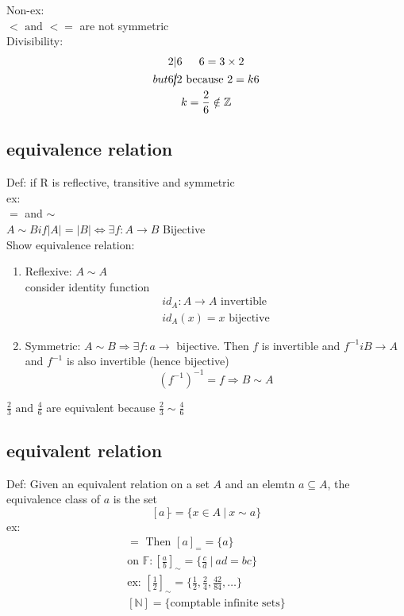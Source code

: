 \documentclass{article}
\begin{document}
Non-ex:\\
$< \text{ and } <=$ are not symmetric \\
Divisibility:
\begin{gather*}
    2|6 \text{\indent } 6=3\times 2 \\
    but 6 \cancel{|} 2 \text{ because } 2=k6 \\
    k= \frac{2}{6} \notin \mathbb{Z}
\end{gather*}

\subsection{equivalence relation}
Def: if R is reflective, transitive and symmetric\\
ex: \\
$=$ and $\sim$ \\
$A\sim B if \lvert A \rvert = \lvert B \rvert \iff \exists f: A \rightarrow B$ Bijective
\\
Show equivalence relation:
\begin{enumerate}
    \item Reflexive: $A \sim A$ \\ consider identity function \begin{gather*}
              id_A: A \rightarrow A \text{ invertible} \\
              id_A(x) = x \text{ bijective}
          \end{gather*}
    \item Symmetric: $A \sim B \Rightarrow \exists f:a \rightarrow$ bijective. Then $f$ is invertible and $f ^{-1} i B \rightarrow A$ and $f ^{-1}$ is also invertible (hence bijective) \[
              (f ^{-1}) ^{-1} = f \Rightarrow B \sim A
          \]
\end{enumerate}

$\frac{2}{3} \text{ and } \frac{4}{6}$ are equivalent because $\frac{2}{3} \sim \frac{4}{6}$ \\

\subsection{equivalent relation}
Def: Given an equivalent relation on a set $A$ and an elemtn $a \subseteq A$, the equivalence class of $a$ is the set
\[
    [a]\tilde{} = \{x \in A \ | \ x \sim a\}
\]
ex: \\
\begin{gather*}
    = \text{ Then } [a]_= = \{a\} \\
    \text{on } \mathbb{F}: [\frac{a}{b}]_\sim = \{\frac{c}{d} \ | \ ad=bc\} \\
    \text{ex: } [\frac{1}{2}]_\sim = \{\frac{1}{2}, \frac{2}{4}, \frac{42}{84}, \dots\} \\
    [\mathbb{N}] = \{\text{comptable infinite sets}\}
\end{gather*}
\end{document}
